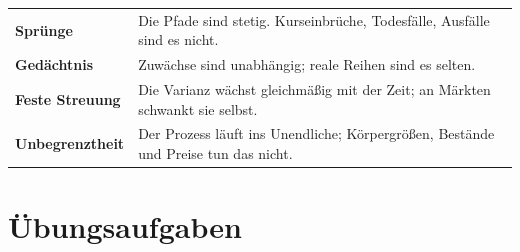 \begin{warnung}
\begin{center}
{\small
\renewcommand{\arraystretch}{1.52}
\begin{tabular}{@{}P{2.6cm}P{6.0cm}@{}}
\toprule
\textbf{Sprünge} & Die Pfade sind stetig. Kurseinbrüche, Todesfälle, Ausfälle sind es nicht.\\
\textbf{Gedächtnis} & Zuwächse sind unabhängig; reale Reihen sind es selten.\\
\textbf{Feste Streuung} & Die Varianz wächst gleichmäßig mit der Zeit; an Märkten schwankt sie selbst.\\
\textbf{Unbegrenztheit} & Der Prozess läuft ins Unendliche; Körpergrößen, Bestände und Preise tun das nicht.\\
\bottomrule
\end{tabular}}
\end{center}

\begin{center}
\begin{minipage}{0.88\textwidth}
\end{minipage}
\end{center}
\end{warnung}

\section{Übungsaufgaben}

